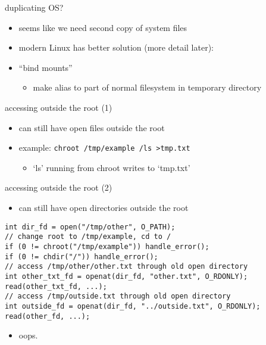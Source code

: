 \begin{frame}{duplicating OS?}
    \begin{itemize}
    \item seems like we need second copy of system files
    \vspace{.5cm}
    \item modern Linux has better solution (more detail later):
    \item ``bind mounts''
        \begin{itemize}
        \item make alias to part of normal filesystem in temporary directory
        \end{itemize}
    \end{itemize}
\end{frame}

\begin{frame}[fragile,label=chrootOutsideExample1]{accessing outside the root (1)}
    \begin{itemize}
    \item can still have open files outside the root
    \item example: \texttt{chroot /tmp/example /ls >tmp.txt}
        \begin{itemize}
        \item `ls' running from chroot writes to `tmp.txt'
        \end{itemize}
    \end{itemize}
\end{frame}

\begin{frame}[fragile,label=chrootOutsideExample2]{accessing outside the root (2)}
    \begin{itemize}
    \item can still have open directories outside the root
    \end{itemize}
\begin{Verbatim}[fontsize=\small]
int dir_fd = open("/tmp/other", O_PATH);
// change root to /tmp/example, cd to /
if (0 != chroot("/tmp/example")) handle_error();
if (0 != chdir("/")) handle_error();
// access /tmp/other/other.txt through old open directory
int other_txt_fd = openat(dir_fd, "other.txt", O_RDONLY);
read(other_txt_fd, ...);
// access /tmp/outside.txt through old open directory
int outside_fd = openat(dir_fd, "../outside.txt", O_RDONLY);
read(other_fd, ...);
\end{Verbatim}
    \begin{itemize}
    \item oops.
    \end{itemize}
\end{frame}

